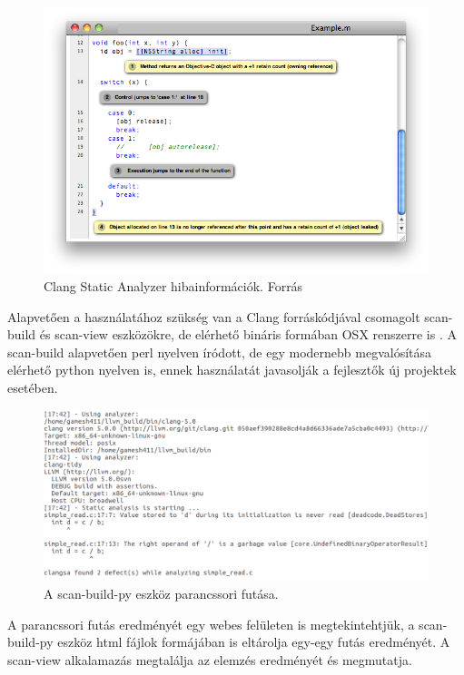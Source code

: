 \documentclass[a4paper,12pt]{report}
\begin{document}
\begin{figure}[h]
\caption{Clang Static Analyzer hibainformációk. Forrás \cite{clangsaimage}}
\centering
\includegraphics[scale=0.6]{analyzer_html.png}
\end{figure}

Alapvetően a használatához szükség van a Clang forráskódjával csomagolt scan-build és scan-view eszközökre, de elérhető bináris formában OSX renszerre is \cite{clangsahomepage}. A scan-build alapvetően perl nyelven íródott, de egy modernebb megvalósítása elérhető python nyelven is, ennek használatát javasolják a fejlesztők új projektek esetében.

\begin{figure}[h]
\caption{A scan-build-py eszköz parancssori futása.}
\centering
\includegraphics[scale=0.4]{uninit_commandline.png}
\end{figure}

A parancssori futás eredményét egy webes felületen is megtekintehtjük, a scan-build-py eszköz html fájlok formájában is eltárolja egy-egy futás eredményét. A scan-view alkalamazás megtalálja az elemzés eredményét és megmutatja.
\end{document}
